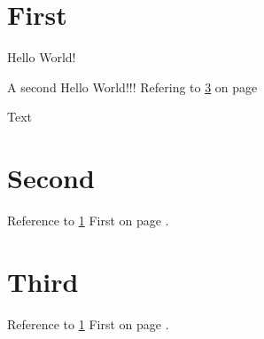 \documentclass{article}
\begin{document}
\section{First} \label{sec:first}

Hello World! \cite{demo}

A second Hello World!!! Refering to \ref{sec:third} on page \pageref{sec:third}

Text

\printbibliography

\section{Second} \label{sec:second}

Reference to \ref{sec:first} First on page \pageref{sec:first}.

\section{Third} \label{sec:third}

Reference to \ref{sec:first} First on page \pageref{sec:first}.
\end{document}
